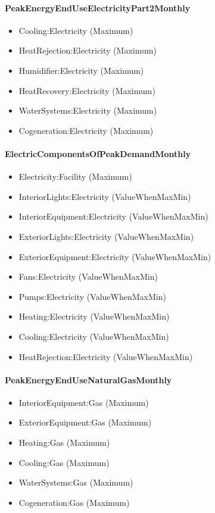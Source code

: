 \paragraph{PeakEnergyEndUseElectricityPart2Monthly}\label{peakenergyenduseelectricitypart2monthly}

\begin{itemize}
\item
  Cooling:Electricity (Maximum)
\item
  HeatRejection:Electricity (Maximum)
\item
  Humidifier:Electricity (Maximum)
\item
  HeatRecovery:Electricity (Maximum)
\item
  WaterSystems:Electricity (Maximum)
\item
  Cogeneration:Electricity (Maximum)
\end{itemize}

\paragraph{ElectricComponentsOfPeakDemandMonthly}\label{electriccomponentsofpeakdemandmonthly}

\begin{itemize}
\item
  Electricity:Facility (Maximum)
\item
  InteriorLights:Electricity (ValueWhenMaxMin)
\item
  InteriorEquipment:Electricity (ValueWhenMaxMin)
\item
  ExteriorLights:Electricity (ValueWhenMaxMin)
\item
  ExteriorEquipment:Electricity (ValueWhenMaxMin)
\item
  Fans:Electricity (ValueWhenMaxMin)
\item
  Pumps:Electricity (ValueWhenMaxMin)
\item
  Heating:Electricity (ValueWhenMaxMin)
\item
  Cooling:Electricity (ValueWhenMaxMin)
\item
  HeatRejection:Electricity (ValueWhenMaxMin)
\end{itemize}

\paragraph{PeakEnergyEndUseNaturalGasMonthly}\label{peakenergyendusenaturalgasmonthly}

\begin{itemize}
\item
  InteriorEquipment:Gas (Maximum)
\item
  ExteriorEquipment:Gas (Maximum)
\item
  Heating:Gas (Maximum)
\item
  Cooling:Gas (Maximum)
\item
  WaterSystems:Gas (Maximum)
\item
  Cogeneration:Gas (Maximum)
\end{itemize}

